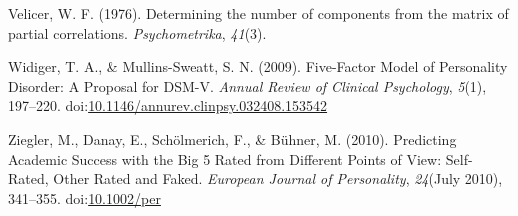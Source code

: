 \documentclass[,man,floatsintext]{apa6}
\theoremstyle{definition}
\theoremstyle{definition}
\theoremstyle{definition}
\theoremstyle{remark}
\begin{document}
\leavevmode\hypertarget{ref-Velicer1976}{}%
Velicer, W. F. (1976). Determining the number of components from the
matrix of partial correlations. \emph{Psychometrika}, \emph{41}(3).

\leavevmode\hypertarget{ref-WidigerMullins2009}{}%
Widiger, T. A., \& Mullins-Sweatt, S. N. (2009). Five-Factor Model of
Personality Disorder: A Proposal for DSM-V. \emph{Annual Review of
Clinical Psychology}, \emph{5}(1), 197--220.
doi:\href{https://doi.org/10.1146/annurev.clinpsy.032408.153542}{10.1146/annurev.clinpsy.032408.153542}

\leavevmode\hypertarget{ref-Ziegler2010}{}%
Ziegler, M., Danay, E., Schölmerich, F., \& Bühner, M. (2010).
Predicting Academic Success with the Big 5 Rated from Different Points
of View: Self-Rated, Other Rated and Faked. \emph{European Journal of
Personality}, \emph{24}(July 2010), 341--355.
doi:\href{https://doi.org/10.1002/per}{10.1002/per}

\endgroup

\clearpage

\renewcommand{\listtablename}{Table captions}

\listoftables
\end{document}
